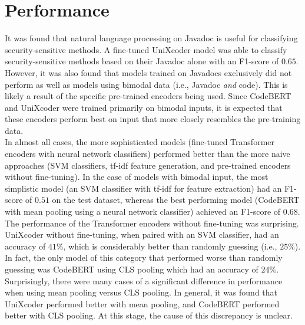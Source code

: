 \section{Performance}

\noindent
It was found that natural language processing on Javadoc is useful for classifying security-sensitive methods. A fine-tuned UniXcoder model was able to classify security-sensitive methods based on their Javadoc alone with an F1-score of $0.65$. \\

\noindent
However, it was also found that models trained on Javadocs exclusively did not perform as well as models using bimodal data (i.e., Javadoc \emph{and} code). This is likely a result of the specific pre-trained encoders being used. Since CodeBERT and UniXcoder were trained primarily on bimodal inputs, it is expected that these encoders perform best on input that more closely resembles the pre-training data. \\

\noindent
In almost all cases, the more sophisticated models (fine-tuned Transformer encoders with neural network classifiers) performed better than the more naive approaches (SVM classifiers, tf-idf feature generation, and pre-trained encoders without fine-tuning). In the case of models with bimodal input, the most simplistic model (an SVM classifier with tf-idf for feature extraction) had an F1-score of $0.51$ on the test dataset, whereas the best performing model (CodeBERT with mean pooling using a neural network classifier) achieved an F1-score of $0.68$. \\

\noindent
The performance of the Transformer encoders without fine-tuning was surprising. UniXcoder without fine-tuning, when paired with an SVM classifier, had an accuracy of $41\%$, which is considerably better than randomly guessing (i.e., $25\%$). In fact, the only model of this category that performed worse than randomly guessing was CodeBERT using CLS pooling which had an accuracy of $24\%$.\\

\noindent
Surprisingly, there were many cases of a significant difference in performance when using mean pooling versus CLS pooling. In general, it was found that UniXcoder performed better with mean pooling, and CodeBERT performed better with CLS pooling. At this stage, the cause of this discrepancy is unclear. \\

